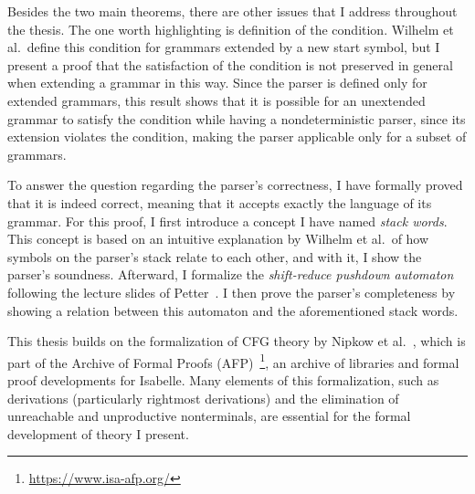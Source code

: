 \begin{isabellebody}
\begin{isamarkuptext}
Besides the two main theorems, there are other issues that I address throughout the thesis. The one
worth highlighting is definition of the  condition. Wilhelm et al.\ define this condition for
grammars extended by a new start symbol, but I present a proof that the satisfaction of the 
condition is not preserved in general when extending a grammar in this way. Since the  parser
is defined only for extended grammars, this result shows that it is possible for an unextended grammar
to satisfy the  condition while having a nondeterministic  parser, since its extension
violates the condition, making the parser applicable only for a subset of  grammars.

To answer the question regarding the parser's correctness, I have formally proved that it
is indeed correct, meaning that it accepts exactly the language of its grammar. For this proof, I
first introduce a concept I have named \emph{stack words}. This concept is based on an intuitive
explanation by Wilhelm et al.\ of how symbols on the parser's stack relate to each other, and with it,
I show the parser's soundness. Afterward, I formalize the \emph{shift-reduce pushdown
automaton} following the lecture slides of Petter~\cite{Petter}. I then prove the parser's
completeness by showing a relation between this automaton and the aforementioned stack words.%
\end{isamarkuptext}\isamarkuptrue%
%
\isadelimdocument
%
\endisadelimdocument
%
\isatagdocument
%
\isamarkuptrue%
%
\endisatagdocument
{\isafolddocument}%
%
\isadelimdocument
%
\endisadelimdocument
%
\begin{isamarkuptext}%
This thesis builds on the formalization of CFG theory by Nipkow et 
al.~\cite{Nipkow-AFP}, which is part of the Archive of Formal Proofs
(AFP)~\footnote{\url{https://www.isa-afp.org/}}, an archive of libraries and formal proof developments for
Isabelle. Many elements of this formalization, such as derivations (particularly rightmost 
derivations) and the elimination of unreachable and unproductive nonterminals, are essential for the
formal development of  theory I present.


\end{isamarkuptext}
\end{isabellebody}
